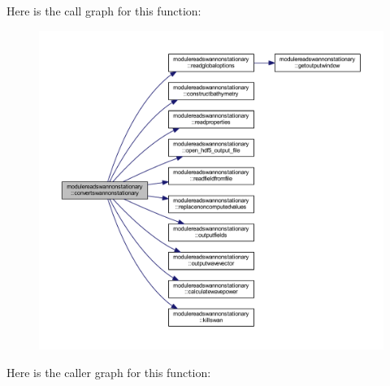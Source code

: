 Here is the call graph for this function\+:\nopagebreak
\begin{figure}[H]
\begin{center}
\leavevmode
\includegraphics[width=350pt]{namespacemodulereadswannonstationary_adb8e6556bbf5f51e70fbc7c10af87a70_cgraph}
\end{center}
\end{figure}
Here is the caller graph for this function\+:\nopagebreak
